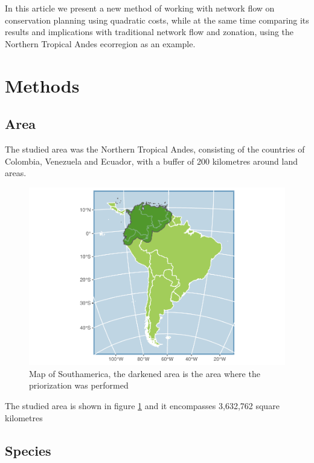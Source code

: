 \documentclass[]{article}
\begin{document}
In this article we present a new method of working with network flow on conservation planning using quadratic costs, while at the same time comparing its results and implications with traditional network flow and zonation, using the Northern Tropical Andes ecorregion as an example.

\hypertarget{methods}{%
\section{Methods}\label{methods}}

\hypertarget{area}{%
\subsection{Area}\label{area}}

The studied area was the Northern Tropical Andes, consisting of the countries of Colombia, Venezuela and Ecuador, with a buffer of 200 kilometres around land areas.

\begin{figure}

{\centering \includegraphics{NFPaper_files/figure-latex/MapArea-1} 

}

\caption{Map of Southamerica, the darkened area is the area where the priorization was performed}\label{fig:MapArea}
\end{figure}

The studied area is shown in figure \ref{fig:MapArea} and it encompasses 3,632,762 square kilometres

\hypertarget{species}{%
\subsection{Species}\label{species}}
\end{document}
